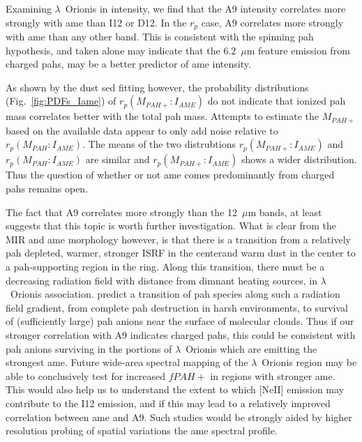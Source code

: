           Examining $\lambda$~Orionis in intensity, we find that the A9 intensity correlates more strongly with \acrshort{ame} than I12 or D12. In the $r_{p}$ case, A9 correlates more strongly with \acrshort{ame} than any other band. This is consistent with the spinning \acrshort{pah} hypothesis, and taken alone may indicate that the 6.2~$\mu$m feature emission from charged \acrshort{pah}s, may be a better predictor of \acrshort{ame} intensity.

          As shown by the dust \acrshort{sed} fitting however, the probability distributions (Fig.~\ref{fig:PDFs_Iame}) of $r_{p}(M_{PAH+}:I_{AME})$ do not indicate that ionized \acrshort{pah} mass correlates better with the total \acrshort{pah} mass. Attempts to estimate the $M_{PAH+}$ based on the available data appear to only add noise relative to $r_{p}(M_{PAH}:I_{AME})$. The means of the two distrubtions $r_{p}(M_{PAH+}:I_{AME})$  and $r_{p}(M_{PAH}:I_{AME})$ are similar and $r_{p}(M_{PAH+}:I_{AME})$ shows a wider distribution. Thus the question of whether or not \acrshort{ame} comes predominantly from charged \acrshort{pah}s remains open.

          The fact that A9 correlates more strongly than the 12~$\mu$m bands, at least suggests that this topic is worth further investigation. What is clear from the MIR and \acrshort{ame} morphology however, is that there is a transition from a relatively \acrshort{pah} depleted, warmer, stronger ISRF in the centerand warm dust in the center to a \acrshort{pah}-supporting region in the ring. Along this transition, there must be a decreasing radiation field with distance from dimnant heating sources, in $\lambda$~Orionis association. \cite{andrews16} predict a transition of \acrshort{pah} species along such a radiation field gradient, from complete \acrshort{pah} destruction in harsh environments, to survival of (sufficiently large) \acrshort{pah} anions near the surface of molecular clouds. Thus if our stronger correlation with A9 indicates charged \acrshort{pah}s, this could be consistent with \acrshort{pah} anions surviving in the portions of $\lambda$~Orionis which are emitting the strongest \acrshort{ame}. Future wide-area spectral mapping of the $\lambda$~Orionis region may be able to conclusively test for increased $fPAH+$ in regions with stronger \acrshort{ame}. This would also help us to understand the extent to which [NeII] emission may contribute to the I12 emission, and if this may lead to a relatively improved correlation between \acrshort{ame} and A9. Such studies would be strongly aided by higher resolution probing of spatial variations the \acrshort{ame} spectral profile.

